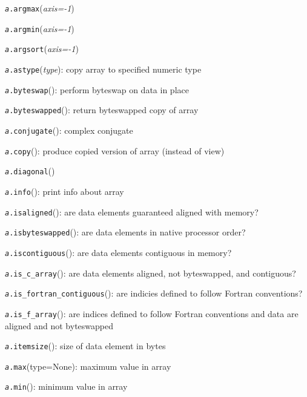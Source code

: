 \begin{description}
\begin{spacing}{0.50}
\item [{\texttt{\emph{a}}\texttt{.argmax}\textmd{(}\textmd{\emph{axis=-1}})}]~
\item [{\texttt{\emph{a}}\texttt{.argmin}\textmd{(}\textmd{\emph{axis=-1}})}]~
\item [{\texttt{\emph{a}}\texttt{.argsort}\textmd{(}\textmd{\emph{axis=-1}})}]~
\item [{\texttt{\emph{a}}\texttt{.astype}\textmd{(}\textmd{\emph{type}}\textmd{):}}] copy
array to specified numeric type
\item [{\texttt{\emph{a}}\texttt{.byteswap}\textmd{():}}] perform byteswap
on data in place
\item [{\texttt{\emph{a}}\texttt{.byteswapped}\textmd{():}}] return byteswapped
copy of array
\item [{\texttt{\emph{a}}\texttt{.conjugate}\textmd{():}}] complex conjugate
\item [{\texttt{\emph{a}}\texttt{.copy}\textmd{():}}] produce copied version
of array (instead of view)
\item [{\texttt{\emph{a}}\texttt{.diagonal}\textmd{()}}]~
\item [{\texttt{\emph{a}}\texttt{.info}\textmd{():}}] print info about
array
\item [{\texttt{\emph{a}}\texttt{.isaligned}\textmd{():}}] are data elements
guaranteed aligned with memory?
\item [{\texttt{\emph{a}}\texttt{.isbyteswapped}\textmd{():}}] are data
elements in native processor order?
\item [{\texttt{\emph{a}}\texttt{.iscontiguous}\textmd{():}}] are data
elements contiguous in memory?
\item [{\texttt{\emph{a}}\texttt{.is\_c\_array}\textmd{():}}] are data
elements aligned, not byteswapped, and contiguous?
\item [{\texttt{\emph{a}}\texttt{.is\_fortran\_contiguous}\textmd{():}}] are
indicies defined to follow Fortran conventions?
\item [{\texttt{\emph{a}}\texttt{.is\_f\_array}\textmd{():}}] are indices
defined to follow Fortran conventions and data are aligned and not
byteswapped
\item [{\texttt{\emph{a}}\texttt{.itemsize}\textmd{():}}] size of data
element in bytes
\item [{\texttt{\emph{a}}\texttt{.max}\textmd{(type=None):}}] maximum value
in array
\item [{\texttt{\emph{a}}\texttt{.min}\textmd{():}}] minimum value in array

\end{spacing}
\end{description}

